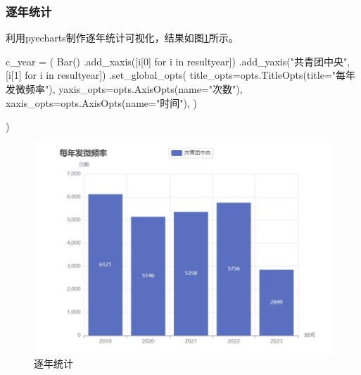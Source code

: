 \subsubsection{逐年统计}
利用pyecharts制作逐年统计可视化，结果如图\ref{fig:yearfre}所示。
\begin{python}
    c_year = (
        Bar()
        .add_xaxis([i[0] for i in resultyear])
        .add_yaxis("共青团中央", [i[1] for i in resultyear])
        .set_global_opts(
            title_opts=opts.TitleOpts(title="每年发微频率"),
            yaxis_opts=opts.AxisOpts(name="次数"),
            xaxis_opts=opts.AxisOpts(name="时间"),
        )

    )
\end{python}
\begin{figure}[H]
    \centering
    \includegraphics[width=12cm]{figure/yearfre.jpg}
    \caption{逐年统计} \label{fig:yearfre}
\end{figure} 

